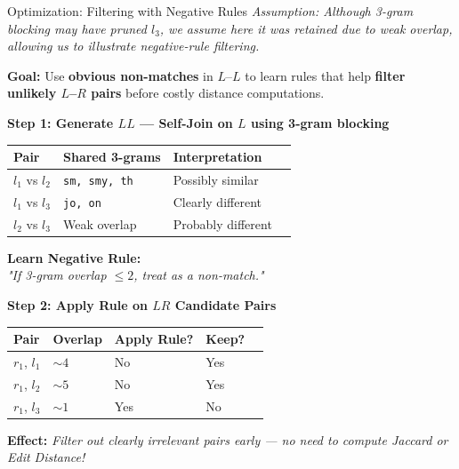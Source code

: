 \documentclass[8pt]{beamer} %
\begin{document}
\begin{frame}{Optimization: Filtering with Negative Rules}
	\textit{\small Assumption: Although 3-gram blocking may have pruned $l_3$, we assume here it was retained due to weak overlap, allowing us to illustrate negative-rule filtering.}
	
	\vspace{1em}
	\textbf{Goal:} Use \textbf{obvious non-matches} in $L$–$L$ to learn rules that help \textbf{filter unlikely $L$–$R$ pairs} before costly distance computations.
	
	\vspace{0.5em}
	\textbf{Step 1: Generate $LL$ — Self-Join on $L$ using 3-gram blocking}
	\begin{tabular}{llll}
		\textbf{Pair} & \textbf{Shared 3-grams} & \textbf{Interpretation} \\
		\hline
		$l_1$ vs $l_2$ & \texttt{sm, smy, th}  & Possibly similar \\
		$l_1$ vs $l_3$ & \texttt{jo, on}       & Clearly different \\
		$l_2$ vs $l_3$ & Weak overlap          & Probably different \\
	\end{tabular}
	
	\vspace{0.5em}
	\textbf{Learn Negative Rule:} \\
	\textit{"If 3-gram overlap $\leq 2$, treat as a non-match."}
	
	\vspace{0.5em}
	\textbf{Step 2: Apply Rule on $LR$ Candidate Pairs}
	\begin{tabular}{lllll}
		\textbf{Pair} & \textbf{Overlap} & \textbf{Apply Rule?} & \textbf{Keep?} \\
		\hline
		$r_1$, $l_1$  & $\sim 4$  & No  & Yes \\
		$r_1$, $l_2$  & $\sim 5$  & No  & Yes \\
		$r_1$, $l_3$  & $\sim 1$  & Yes & No  \\
	\end{tabular}
	
	\vspace{0.5em}
	\textbf{Effect:} \textit{Filter out clearly irrelevant pairs early — no need to compute Jaccard or Edit Distance!}
\end{frame}
\end{document}
